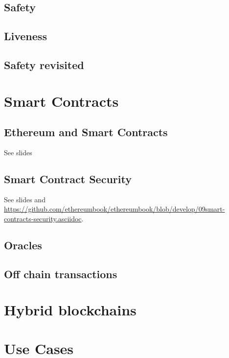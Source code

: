 \documentclass[a4paper,11pt]{report}
\begin{document}
	\section{Safety}
	\label{sec:safe1}
	
	
	\section{Liveness}
	\label{sec:live}
	
	
	\section{Safety revisited}
	\label{sec:safe2}
	
	
\chapter{Smart Contracts}

	\section{Ethereum and Smart Contracts}
	See slides 

	\section{Smart Contract Security}
	See slides and \url{https://github.com/ethereumbook/ethereumbook/blob/develop/09smart-contracts-security.asciidoc}.
	
	\section{Oracles}
	
	\section{Off chain transactions}

\chapter{Hybrid blockchains}
	\label{ch:hybrid}
	
	
\chapter{Use Cases}
	\label{ch:useCases}
	
	
\end{document}
